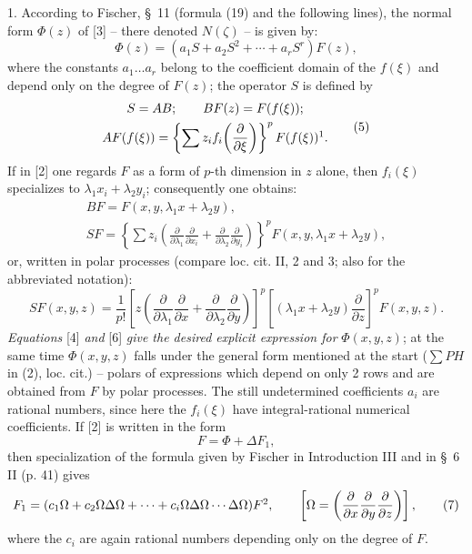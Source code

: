 \documentclass[11pt]{article}
\providecommand{\p}{\partial}
\providecommand{\p}{\partial}
\begin{document}
1. According to Fischer, \S~11 (formula (19) and the following lines), the normal form $\Phi(z)$ of [3] -- there denoted $N(\zeta)$ -- is given by:
\begin{equation}
        \Phi(z)=(a_1S+a_2S^2+\cdots+a_rS^r)F(z),
\tag{4}
\end{equation}
where the constants $a_1\ldots a_r$ belong to the coefficient domain of the $f(\xi)$ and depend only on the degree of $F(z)$; the operator $S$ is defined by
\begin{equation}
\begin{gathered}
        S=AB;\qquad BF(z)=F(f(\xi));\\
        AF(f(\xi))=\left\{\sum z_i f_i\!\left(\frac{\p}{\p\xi}\right)\right\}^{p}F(f(\xi))\footnotemark.
\end{gathered}
\tag{5}
\end{equation}
If in [2] one regards $F$ as a form of $p$-th dimension in $z$ alone, then $f_i(\xi)$ specializes to $\lambda_1x_i+\lambda_2y_i$; consequently one obtains:
\[
\begin{gathered}
        BF=F(x,y,\lambda_1x+\lambda_2y),\\
        SF=\left\{\sum z_i\left(\frac{\p}{\p\lambda_1}\frac{\p}{\p x_i}+
        \frac{\p}{\p\lambda_2}\frac{\p}{\p y_i}\right)\right\}^{p}
        F(x,y,\lambda_1x+\lambda_2y),
\end{gathered}
\]
or, written in polar processes (compare loc. cit. II, 2 and 3; also for the abbreviated notation):
\begin{equation}
        SF(x,y,z)=\frac1{p!}\left[z\left(\frac{\p}{\p\lambda_1}\frac{\p}{\p x}+
        \frac{\p}{\p\lambda_2}\frac{\p}{\p y}\right)\right]^p
        \left[(\lambda_1x+\lambda_2y)\frac{\p}{\p z}\right]^p F(x,y,z).
\tag{6}
\end{equation}
\emph{Equations} [4] \emph{and} [6] \emph{give the desired explicit expression for} $\Phi(x,y,z)$; at the same time $\Phi(x,y,z)$ falls under the general form mentioned at the start ($\sum PH$ in (2), loc. cit.) -- polars of expressions which depend on only 2 rows and are obtained from $F$ by polar processes. The still undetermined coefficients $a_i$ are rational numbers, since here the $f_i(\xi)$ have integral-rational numerical coefficients. If [2] is written in the form
\begin{equation}
        F=\Phi+\Delta F_1,
\tag{2a}
\end{equation}
then specialization of the formula given by Fischer in Introduction III and in \S~6 II (p. 41) gives
\begin{equation}
        F_1=(c_1\Omega+c_2\Omega\Delta\Omega+\cdots+c_i\Omega\Delta\Omega\cdots\Delta\Omega)F\footnotemark,
        \qquad \left[\Omega=\left(\frac{\p}{\p x}\frac{\p}{\p y}\frac{\p}{\p z}\right)\right],
\tag{7}
\end{equation}
where the $c_i$ are again rational numbers depending only on the degree of $F$.
\end{document}

